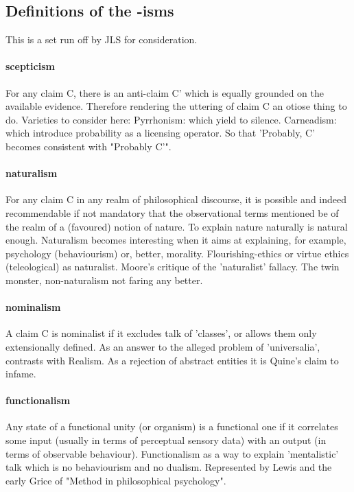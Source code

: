 \documentclass[10pt,titlepage]{book}
\begin{document}
\subsection{Definitions of the -isms}

This is a set run off by JLS for consideration.

\paragraph{scepticism} For any claim C, there is an anti-claim C' which is equally  
grounded on the available evidence. Therefore rendering the uttering of  claim 
C an otiose thing to do. Varieties to consider here: Pyrrhonism:  which 
yield to silence. Carneadism: which introduce probability as a licensing  
operator. So that 'Probably, C' becomes consistent with "Probably C'". 
 
\paragraph{naturalism} For any claim C in any realm of philosophical discourse, it is  
possible and indeed recommendable if not mandatory that the observational 
terms  mentioned be of the realm of a (favoured) notion of nature. To explain 
nature  naturally is natural enough. Naturalism becomes interesting when it 
aims at  explaining, for example, psychology (behaviourism) or, better, 
morality.  Flourishing-ethics or virtue ethics (teleological) as naturalist. 
Moore's  critique of the 'naturalist' fallacy. The twin monster, 
non-naturalism not  faring any better.
 
\paragraph{nominalism} A claim C is nominalist if it excludes talk of 'classes', or  
allows them only extensionally defined.
As an answer to the alleged problem of 'universalia', contrasts with Realism.
As a rejection of abstract entities it is Quine's claim to infame.
 
\paragraph{functionalism} Any state of a functional unity (or organism) is a  
functional one if it correlates some input (usually in terms of perceptual  sensory 
data) with an output (in terms of observable behaviour). Functionalism  as a 
way to explain 'mentalistic' talk which is no behaviourism and no dualism.  
Represented by Lewis and the early Grice of "Method in philosophical  
psychology". 
 
\end{document}
